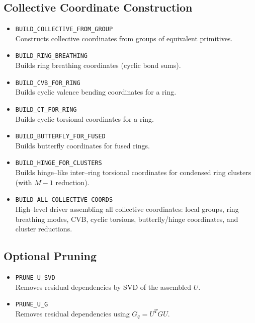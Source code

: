 \documentclass[11pt,a4paper]{article}
\begin{document}
\subsection{Collective Coordinate Construction}

\begin{itemize}
  \item \texttt{BUILD\_COLLECTIVE\_FROM\_GROUP} \\
  Constructs collective coordinates from groups of equivalent primitives.

  \item \texttt{BUILD\_RING\_BREATHING} \\
  Builds ring breathing coordinates (cyclic bond sums).

  \item \texttt{BUILD\_CVB\_FOR\_RING} \\
  Builds cyclic valence bending coordinates for a ring.

  \item \texttt{BUILD\_CT\_FOR\_RING} \\
  Builds cyclic torsional coordinates for a ring.

  \item \texttt{BUILD\_BUTTERFLY\_FOR\_FUSED} \\
  Builds butterfly coordinates for fused rings.

  \item \texttt{BUILD\_HINGE\_FOR\_CLUSTERS} \\
  Builds hinge--like inter--ring torsional coordinates for condensed ring
  clusters (with $M-1$ reduction).

  \item \texttt{BUILD\_ALL\_COLLECTIVE\_COORDS} \\
  High--level driver assembling all collective coordinates:
  local groups, ring breathing modes, CVB, cyclic torsions, butterfly/hinge
  coordinates, and cluster reductions.
\end{itemize}

\subsection{Optional Pruning}

\begin{itemize}
  \item \texttt{PRUNE\_U\_SVD} \\
  Removes residual dependencies by SVD of the assembled $U$.

  \item \texttt{PRUNE\_U\_G} \\
  Removes residual dependencies using $G_q = U^T G U$.
\end{itemize}
\end{document}
